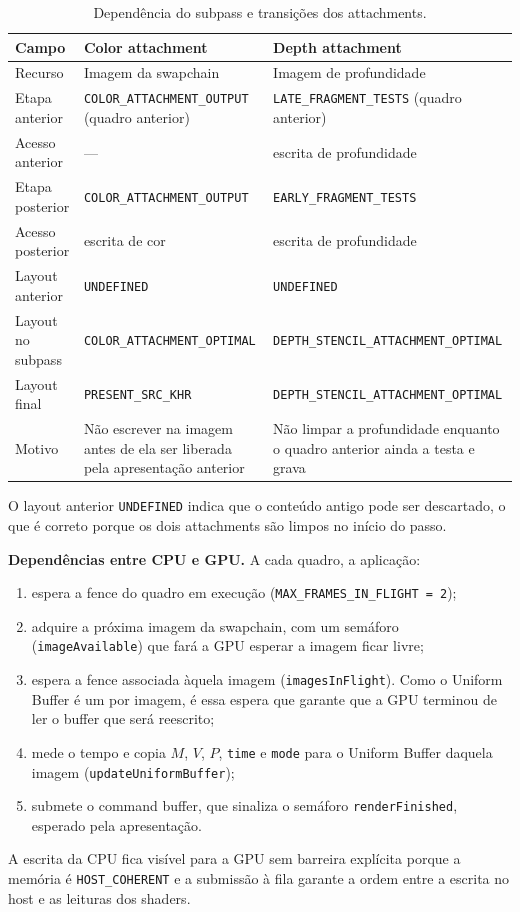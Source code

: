 \begin{table}[H]
\centering
\caption{Dependência do subpass e transições dos attachments.}
\label{tab:subpass-dep}
\footnotesize
\begin{tabular}{p{2.4cm}p{5.0cm}p{6.3cm}}
\toprule
\textbf{Campo} & \textbf{Color attachment} & \textbf{Depth attachment} \\
\midrule
Recurso & Imagem da swapchain & Imagem de profundidade \\
Etapa anterior & \texttt{COLOR\_ATTACHMENT\_OUTPUT} (quadro anterior) & \texttt{LATE\_FRAGMENT\_TESTS} (quadro anterior) \\
Acesso anterior & --- & escrita de profundidade \\
Etapa posterior & \texttt{COLOR\_ATTACHMENT\_OUTPUT} & \texttt{EARLY\_FRAGMENT\_TESTS} \\
Acesso posterior & escrita de cor & escrita de profundidade \\
Layout anterior & \texttt{UNDEFINED} & \texttt{UNDEFINED} \\
Layout no subpass & \texttt{COLOR\_ATTACHMENT\_OPTIMAL} & \texttt{DEPTH\_STENCIL\_ATTACHMENT\_OPTIMAL} \\
Layout final & \texttt{PRESENT\_SRC\_KHR} & \texttt{DEPTH\_STENCIL\_ATTACHMENT\_OPTIMAL} \\
Motivo & Não escrever na imagem antes de ela ser liberada pela apresentação anterior & Não limpar a profundidade enquanto o quadro anterior ainda a testa e grava \\
\bottomrule
\end{tabular}
\end{table}

O layout anterior \texttt{UNDEFINED} indica que o conteúdo antigo pode ser descartado, o que é correto porque os dois attachments são limpos no início do passo.

\textbf{Dependências entre CPU e GPU.} A cada quadro, a aplicação:
\begin{enumerate}
    \item espera a fence do quadro em execução (\texttt{MAX\_FRAMES\_IN\_FLIGHT = 2});
    \item adquire a próxima imagem da swapchain, com um semáforo (\texttt{imageAvailable}) que fará a GPU esperar a imagem ficar livre;
    \item espera a fence associada àquela imagem (\texttt{imagesInFlight}). Como o Uniform Buffer é um por imagem, é essa espera que garante que a GPU terminou de ler o buffer que será reescrito;
    \item mede o tempo e copia \(M\), \(V\), \(P\), \texttt{time} e \texttt{mode} para o Uniform Buffer daquela imagem (\texttt{updateUniformBuffer});
    \item submete o command buffer, que sinaliza o semáforo \texttt{renderFinished}, esperado pela apresentação.
\end{enumerate}
A escrita da CPU fica visível para a GPU sem barreira explícita porque a memória é \texttt{HOST\_COHERENT} e a submissão à fila garante a ordem entre a escrita no host e as leituras dos shaders.

